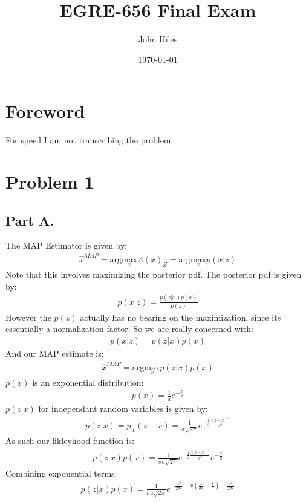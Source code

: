 \documentclass{article}
\title{EGRE-656 Final Exam}
\author{John Hiles}
\date\today
\begin{document}
\maketitle %

\section*{Foreword}
For speed I am not transcribing the problem.

\section*{Problem 1}
\subsection*{Part A.}
The MAP Estimator is given by:
\begin{align*}
\hat{x}^{MAP} = \text{arg} \underset{x}{\text{max}}\Lambda(x)_Z = \text{arg} \underset{x}{\text{max}}p(x|z)
\end{align*}
Note that this involves maximizing the posterior pdf. The posterior pdf is given by:
\begin{align*}
p(x|z) = \frac{p(z|x)p(x)}{p(z)}
\end{align*}
However the $p(z)$ actually has no bearing on the maximization, since its essentially a normalization factor. So we are really concerned with:
\begin{align*}
p(x|z) = p(z|x)p(x)
\end{align*}
And our MAP estimate is:
\begin{align*}
\hat{x}^{MAP} = \text{arg} \underset{x}{\text{max}} p(z|x)p(x)
\end{align*}
$p(x)$ is an exponential distribution:
\begin{align*}
p(x) = \frac{1}{a} e^{-\frac{x}{a}}
\end{align*}
$p(z|x)$ for independant random variables is given by:
\begin{align*}
p(z|x) = p_w(z-x) = \frac{1}{\sigma \sqrt{2\pi}} e^{-\frac{1}{2}\frac{(z-x)^2}{\sigma^2}}
\end{align*}
As such our likleyhood function is:
\begin{align*}
p(z|x) p(x) = \frac{1}{\sigma a \sqrt{2\pi}} e^{-\frac{1}{2}\frac{(z-x)^2}{\sigma^2}} e^{-\frac{x}{a}}
\end{align*}
Combining exponential terms:
\begin{align*}
\boxed{p(z|x) p(x) = \frac{1}{\sigma a \sqrt{2\pi}} e^{-\frac{x^2}{2\sigma^2} + x(\frac{z}{\sigma^2} - \frac{1}{a}) - \frac{z^2}{2\sigma^2}} }
\end{align*}
\end{document}
